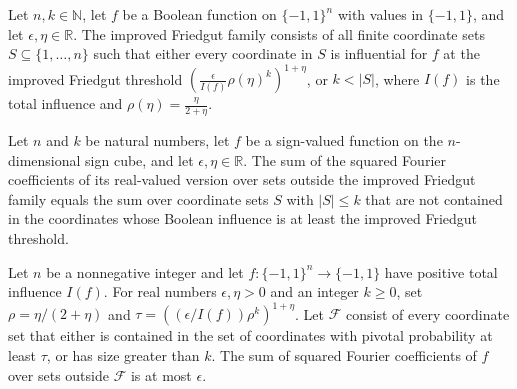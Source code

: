\begin{definition}
\label{FABL.improvedFriedgutFamily}
\leanok
{}
Let $n,k\in\mathbb N$, let $f$ be a Boolean function on $\{−1,1\}^n$ with values in
$\{−1,1\}$, and let $\epsilon,\eta\in\mathbb R$. The improved Friedgut family consists
of all finite coordinate sets $S\subseteq\{1,\ldots,n\}$ such that either every
coordinate in $S$ is influential for $f$ at the improved Friedgut threshold
$\left(\frac{\epsilon}{I(f)}\rho(\eta)^k\right)^{1+\eta}$, or $k<|S|$, where $I(f)$ is
the total influence and $\rho(\eta)=\frac{\eta}{2+\eta}$.
\end{definition}

\begin{theorem}
\label{FABL.fourierWeightOutside_improvedFriedgutFamily}
\leanok
{}
Let $n$ and $k$ be natural numbers, let $f$ be a sign-valued function on the
$n$-dimensional sign cube, and let $\epsilon,\eta\in\mathbb{R}$. The sum of the squared
Fourier coefficients of its real-valued version over sets outside the improved Friedgut
family equals the sum over coordinate sets $S$ with $|S|\le k$ that are not contained in
the coordinates whose Boolean influence is at least the improved Friedgut threshold.
\end{theorem}

\begin{theorem}
\label{FABL.improvedFriedgut_spectrum_concentrated}
\leanok
{}
Let $n$ be a nonnegative integer and let $f:\{-1,1\}^n\to\{-1,1\}$ have positive total
influence $I(f)$. For real numbers $\epsilon,\eta>0$ and an integer $k\ge0$, set
$\rho=\eta/(2+\eta)$ and $\tau=((\epsilon/I(f))\rho^k)^{1+\eta}$. Let $\mathcal F$
consist of every coordinate set that either is contained in the set of coordinates with
pivotal probability at least $\tau$, or has size greater than $k$. The sum of squared
Fourier coefficients of $f$ over sets outside $\mathcal F$ is at most $\epsilon$.
\end{theorem}

